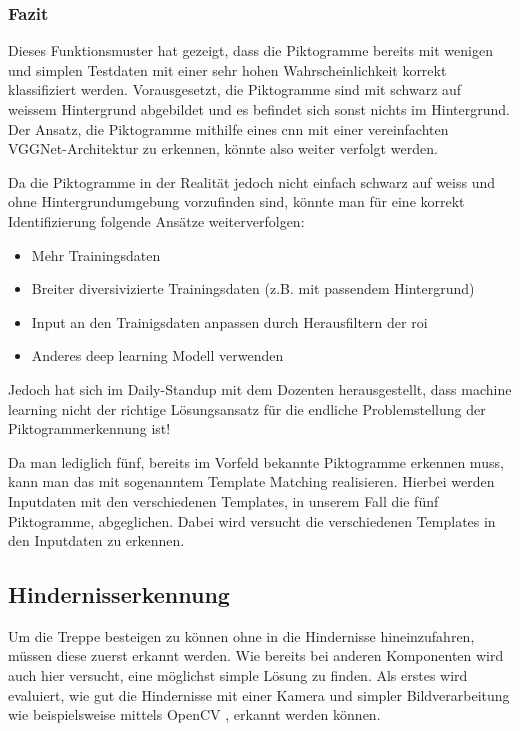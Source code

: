 \subsubsection{Fazit}
Dieses Funktionsmuster hat gezeigt, dass die Piktogramme bereits mit wenigen und simplen Testdaten mit einer sehr hohen Wahrscheinlichkeit korrekt klassifiziert werden. Vorausgesetzt, die Piktogramme sind mit schwarz auf weissem Hintergrund abgebildet und es befindet sich sonst nichts im Hintergrund. Der Ansatz, die Piktogramme mithilfe eines \acrshort{cnn} mit einer vereinfachten VGGNet-Architektur zu erkennen, könnte also weiter verfolgt werden.  

Da die Piktogramme in der Realität jedoch nicht einfach schwarz auf weiss und ohne Hintergrundumgebung vorzufinden sind, könnte man für eine korrekt Identifizierung folgende Ansätze weiterverfolgen:
\begin{itemize}
    \item Mehr Trainingsdaten
    \item Breiter diversivizierte Trainingsdaten (z.B. mit passendem Hintergrund)
    \item Input an den Trainigsdaten anpassen durch Herausfiltern der \acrfull{roi}
    \item Anderes deep learning Modell verwenden
 \end{itemize}
 
Jedoch hat sich im Daily-Standup mit dem Dozenten herausgestellt, dass machine learning nicht der richtige Lösungsansatz für die endliche Problemstellung der Piktogrammerkennung ist! 

Da man lediglich fünf, bereits im Vorfeld bekannte Piktogramme erkennen muss, kann man das mit sogenanntem Template Matching \cite{OpenCV-Template-Matching} realisieren. Hierbei werden Inputdaten mit den verschiedenen Templates, in unserem Fall die fünf Piktogramme, abgeglichen. Dabei wird versucht die verschiedenen Templates in den Inputdaten zu erkennen. 


\subsection{Hindernisserkennung}
\label{sec:hindernisserkennung-funktinosmuster}
Um die Treppe besteigen zu können ohne in die Hindernisse hineinzufahren, müssen
diese zuerst erkannt werden. Wie bereits bei anderen Komponenten wird auch hier versucht, eine möglichst simple Lösung zu finden.
Als erstes wird evaluiert, wie gut die Hindernisse mit einer Kamera und simpler Bildverarbeitung wie beispielsweise mittels OpenCV \cite{OpenCV}, erkannt werden
können.


